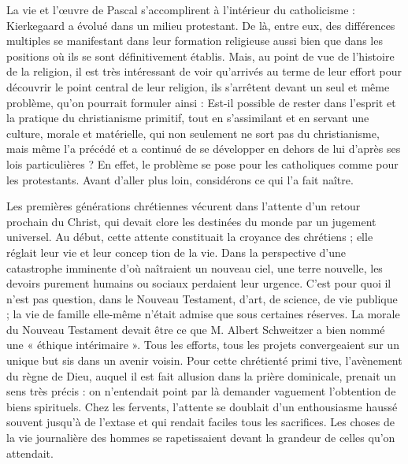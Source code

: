 \documentclass[12pt,a4paper]{article}
\newcommand{\opage}[1]{\marginnote{\footnotesize\textit{[#1]}}}
\begin{document}
La vie et l'œuvre de Pascal s'accomplirent à l'intérieur du catholicisme : Kierkegaard a évolué dans un milieu protestant. De là,
entre eux, des différences multiples se manifestant dans leur formation
religieuse aussi bien que dans les positions où ils se sont
définitivement établis. Mais, au point de vue de l'histoire de la religion,
il est très intéressant de voir qu'arrivés au terme de leur
effort pour découvrir le point central de leur religion, ils s'arrêtent
devant un seul et même problème, qu'on pourrait formuler ainsi :
Est-il possible de rester dans l'esprit et la pratique du christianisme
primitif, %
tout en s'assimilant et en servant une culture, morale
et matérielle, qui non seulement ne sort pas du christianisme, mais
même l'a précédé et a continué de se développer en dehors de lui
d'après ses lois particulières ? En effet, le problème se pose pour
les catholiques comme pour les protestants. Avant d'aller plus loin,
considérons ce qui l'a fait naître.

Les premières générations chrétiennes vécurent dans l'attente
d'un retour prochain du Christ, qui devait clore les destinées du
monde par un jugement universel. Au début, cette attente constituait
la croyance des chrétiens ; elle réglait leur vie et leur concep\-%
\opage{236}tion de la vie. Dans la perspective d'une catastrophe imminente
d'où naîtraient un nouveau ciel, une terre nouvelle, les devoirs
purement humains ou sociaux perdaient leur urgence. C'est pour\-%
quoi il n'est pas question, dans le Nouveau Testament, d'art, de
science, de vie publique ; la vie de famille elle-même n'était admise
que sous certaines réserves. La morale du Nouveau Testament devait
être ce que M. Albert Schweitzer a bien nommé une « éthique intérimaire
». Tous les efforts, tous les projets convergeaient sur un
unique but sis dans un avenir voisin. Pour cette chrétienté primi\-%
tive, l'avènement du règne de Dieu, auquel il est fait allusion dans
la prière dominicale, prenait un sens très précis : on n'entendait
point par là demander vaguement l'obtention de biens spirituels.
Chez les fervents, l'attente se doublait d'un enthousiasme haussé
souvent jusqu'à de l'extase et qui rendait faciles tous les sacrifices.
Les choses de la vie journalière des hommes se rapetissaient devant
la grandeur de celles qu'on attendait.
\end{document}
